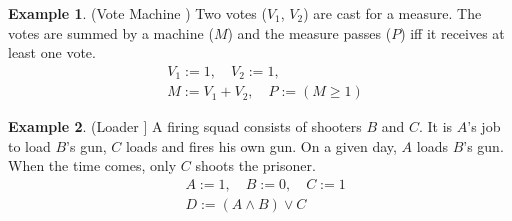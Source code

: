 \documentclass[11pt,a4paper]{book}
\theoremstyle{definition}
\theoremstyle{definition}
\newtheorem{example}{Example}[section]
\theoremstyle{definition}
\theoremstyle{remark}
\begin{document}
\begin{example}(Vote Machine \cite{Weslake2015partialtheory})
Two votes ($V_1$, $V_2$) are cast for a measure. The votes are summed by a machine ($M$) and the measure passes ($P$) iff it receives at least one vote.
\begin{equation*}
\begin{split}
&V_1:=1, \quad V_2:= 1 ,\\
&M:= V_1 +V_2, \quad P:= (M \geq 1)
\end{split}
\end{equation*}
\begin{center}
\end{center}
\end{example}



\begin{example}(Loader \cite{hopkins2003clarifying,bochman2018actual,Weslake2015partialtheory}]
A firing squad consists of shooters $B$ and $C$. It is $A$’s job to load $B$’s gun, $C$ loads and fires his own gun. On a given day, $A$ loads $B$’s gun. When the time comes, only $C$ shoots the prisoner.
\begin{equation*}
\begin{split}
&A:=1, \quad B:=0, \quad C:=1 \\
&D:= (A \land B) \lor C
\end{split}
\end{equation*}
\begin{center}
\end{center}
\end{example}
\end{document}
